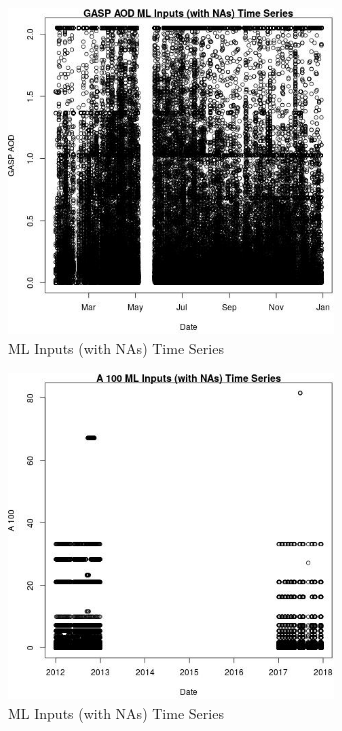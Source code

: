 \begin{figure} 
\centering  
\includegraphics[width=0.77\textwidth]{Code_Outputs/Report_ML_input_PM25_Step4_part_e_de_duplicated_aves_compiled_2019-05-14wNAs_GASP_AODvDate.jpg} 
\caption{\label{fig:Report_ML_input_PM25_Step4_part_e_de_duplicated_aves_compiled_2019-05-14wNAsGASP_AODvDate}ML Inputs (with NAs) Time Series} 
\end{figure} 
 

\begin{figure} 
\centering  
\includegraphics[width=0.77\textwidth]{Code_Outputs/Report_ML_input_PM25_Step4_part_e_de_duplicated_aves_compiled_2019-05-14wNAs_A_100vDate.jpg} 
\caption{\label{fig:Report_ML_input_PM25_Step4_part_e_de_duplicated_aves_compiled_2019-05-14wNAsA_100vDate}ML Inputs (with NAs) Time Series} 
\end{figure} 
 

